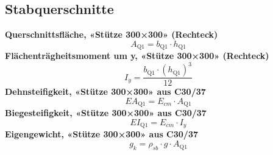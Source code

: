\documentclass[11pt,a4paper]{article}
\begin{document}
\subsection{Stabquerschnitte}
\noindent\textbf{Querschnittsfläche, «Stütze 300×300» (Rechteck)}
\begin{equation*}
A_{\text{Q1}} = b_{\text{Q1}} \cdot h_{\text{Q1}}
\end{equation*}
\noindent\textbf{Flächenträgheitsmoment um y, «Stütze 300×300» (Rechteck)}
\begin{equation*}
I_{y} = \frac{b_{\text{Q1}} \cdot \left(h_{\text{Q1}}\right)^{3}}{12}
\end{equation*}
\noindent\textbf{Dehnsteifigkeit, «Stütze 300×300» aus C30/37}
\begin{equation*}
EA_{\text{Q1}} = E_{cm} \cdot A_{\text{Q1}}
\end{equation*}
\noindent\textbf{Biegesteifigkeit, «Stütze 300×300» aus C30/37}
\begin{equation*}
EI_{\text{Q1}} = E_{cm} \cdot I_{y}
\end{equation*}
\noindent\textbf{Eigengewicht, «Stütze 300×300» aus C30/37}
\begin{equation*}
g_{k} = \rho_{sb} \cdot g \cdot A_{\text{Q1}}
\end{equation*}
\end{document}
